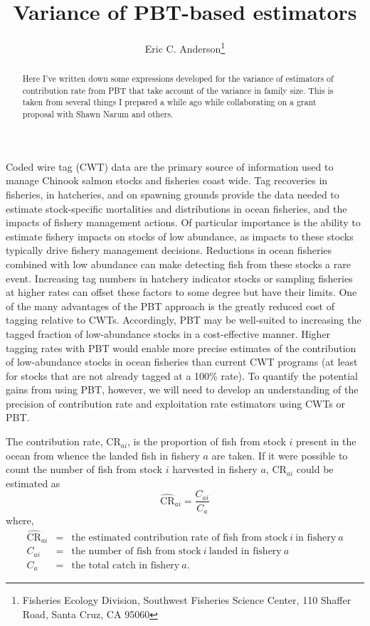 \documentclass[11pt]{article}
\title{Variance of PBT-based estimators}
\author{Eric C. Anderson\thanks{
    Fisheries Ecology Division, 
    Southwest Fisheries Science Center, 
    110 Shaffer Road,
    Santa Cruz, CA 95060}
}
\newcommand{\CR}{\mathrm{CR}}
\begin{document}
\maketitle

\begin{abstract}
Here I've written down some expressions developed for the variance of estimators of contribution rate from PBT that
take account of the variance in family size.  This is taken from several things I prepared a while ago while collaborating
on a grant proposal with Shawn Narum and others.
\end{abstract}


Coded wire tag (CWT) data are the primary source of information used to manage Chinook salmon stocks and 
fisheries coast wide. Tag recoveries in fisheries, in hatcheries, and on spawning grounds provide the data needed 
to estimate stock-specific mortalities and distributions in ocean fisheries, and the impacts of fishery management 
actions. Of particular importance is the ability to estimate fishery impacts on stocks of low abundance, as impacts 
to these stocks typically drive fishery management decisions. Reductions in ocean fisheries combined with low 
abundance can make detecting fish from these stocks a rare event. Increasing tag numbers in hatchery indicator 
stocks or sampling fisheries at higher rates can offset these factors to some degree but have their limits.
One of the many advantages of the PBT approach is the greatly reduced cost of tagging relative to CWTs. 
Accordingly, PBT may be well-suited to increasing the tagged fraction of low-abundance stocks in a cost-effective
manner. Higher tagging rates with PBT would enable more precise estimates of the contribution of low-abundance
stocks in ocean fisheries than current CWT programs (at least for stocks that are not already tagged 
at a 100\% rate). To quantify the potential gains from using PBT, however, we will need to develop an understanding of the
 precision of contribution rate and exploitation rate estimators using CWTs or PBT.
 
 
The contribution rate, $\CR_{ai}$, is the proportion of fish from stock $i$ present in the ocean from whence the landed 
fish in fishery $a$ are taken. If it were possible to count the number of fish from stock $i$ harvested in fishery $a$, $\CR_{ai}$ 
could be estimated as
\begin{equation}
\widehat{\CR}_{ai} = \frac{C_{ai}}{C_a}
\label{eq:crai-1}
\end{equation}
where,
\begin{eqnarray*}
\widehat{\CR}_{ai} & = & \mbox{the estimated contribution rate of fish from stock}~i~\mbox{in fishery}~a \\
C_{ai}                    & = &  \mbox{the number of fish from stock}~i~\mbox{landed in fishery}~a \\
C_a                       & = &  \mbox{the total catch in fishery}~a.
\end{eqnarray*}
\end{document}
